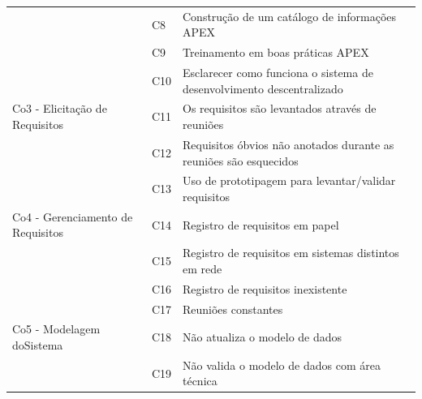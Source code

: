 \begin{longtable}{|M{4.0cm} | M{1.3cm}| m{9.5cm}|}
                                                      & C8             & Construção de um catálogo de informações APEX                                     \\ 
                                                      & C9             & Treinamento em boas práticas APEX                                                 \\ 
                                                      & C10            & Esclarecer como funciona o sistema de desenvolvimento descentralizado             \\ \hline
Co3 - Elicitação \newline de Requisitos       & C11            & Os requisitos são levantados através de reuniões                                  \\ 
                                                      & C12            & Requisitos óbvios não anotados durante as reuniões são esquecidos                 \\ 
                                                      & C13            & Uso de prototipagem para levantar/validar requisitos                              \\ \hline
Co4 - Gerenciamento \newline de Requisitos    & C14            & Registro de requisitos em papel                                                   \\ 
                                                      & C15            & Registro de requisitos em sistemas distintos em rede                              \\ 
                                                      & C16            & Registro de requisitos inexistente                                                \\ 
                                                      & C17            & Reuniões constantes                                                               \\ \hline
Co5 - Modelagem do\newline Sistema           & C18            & Não atualiza o modelo de dados                                                    \\ 
                                                      & C19            & Não valida o modelo de dados com área técnica                                     \\ 

\end{longtable}
